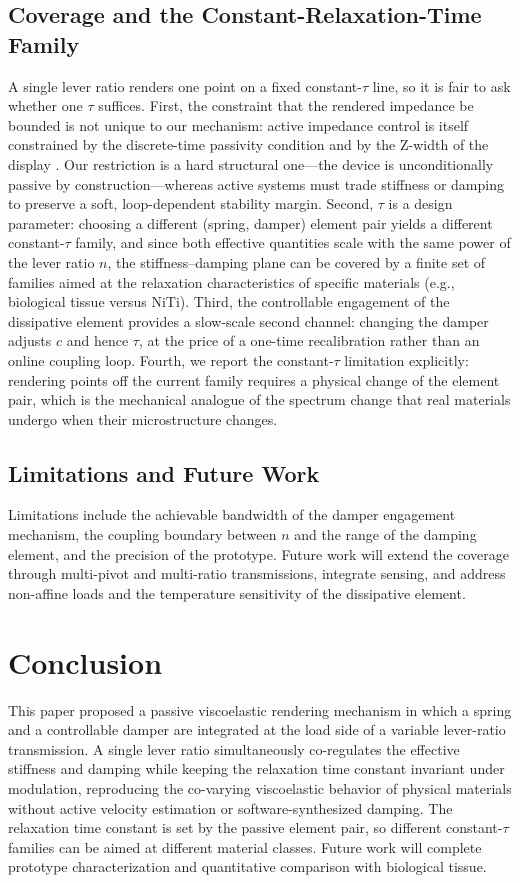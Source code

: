 ﻿\documentclass[conference]{IEEEtran}
\begin{document}
\subsection{Coverage and the Constant-Relaxation-Time Family}
A single lever ratio renders one point on a fixed constant-$\tau$ line, so it
is fair to ask whether one $\tau$ suffices. First, the constraint that the
rendered impedance be bounded is not unique to our mechanism: active
impedance control is itself constrained by the discrete-time passivity
condition and by the Z-width of the display
\cite{colgate1997passivity,colgate1994factors}. Our restriction is a hard
structural one---the device is unconditionally passive by construction---whereas
active systems must trade stiffness or damping to preserve a soft,
loop-dependent stability margin. Second, $\tau$ is a design parameter:
choosing a different (spring, damper) element pair yields a different
constant-$\tau$ family, and since both effective quantities scale with the
same power of the lever ratio $n$, the stiffness--damping plane can be
covered by a finite set of
families aimed at the relaxation characteristics of specific materials
(e.g., biological tissue versus NiTi). Third, the controllable engagement of
the dissipative element provides a slow-scale second channel: changing the
damper adjusts $c$ and hence $\tau$, at the price of a one-time
recalibration rather than an online coupling loop. Fourth, we report the
constant-$\tau$ limitation explicitly: rendering points off the current
family requires a physical change of the element pair, which is the
mechanical analogue of the spectrum change that real materials undergo when
their microstructure changes.

\subsection{Limitations and Future Work}
Limitations include the achievable bandwidth of the damper engagement
mechanism, the coupling boundary between $n$ and the range of the damping
element, and the precision of the prototype. Future work will extend the
coverage through multi-pivot and multi-ratio transmissions, integrate
sensing, and address non-affine loads and the temperature sensitivity of the
dissipative element.

\section{Conclusion}\label{sec:concl}
This paper proposed a passive viscoelastic rendering mechanism in which a
spring and a controllable damper are integrated at the load side of a
variable lever-ratio transmission. A single lever ratio simultaneously
co-regulates the effective stiffness and damping while keeping the
relaxation time constant invariant under modulation, reproducing the
co-varying viscoelastic behavior of physical materials without active
velocity estimation or software-synthesized damping. The relaxation time
constant is set by the passive element pair, so
different constant-$\tau$ families can be aimed at different material
classes. Future work will complete prototype characterization and
quantitative comparison with biological tissue.
\end{document}
